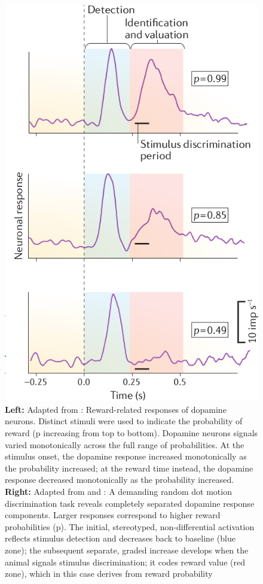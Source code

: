 \begin{figure}[H]
    \includegraphics[scale=0.3]{figures/ResponseProbSchultz.png}
    \caption{\textbf{Left:} Adapted from : Reward-related responses of dopamine neurons. Distinct stimuli were used to indicate the probability of reward (p increasing from top to bottom). Dopamine neurons signals varied monotonically across the full range of probabilities. At the stimulus onset, the dopamine response increased monotonically as the probability increased; at the reward time instead, the dopamine response decreased monotonically as the probability increased. \textbf{Right:} Adapted from  and : A demanding random dot motion discrimination task reveals completely separated dopamine response components. Larger responses correspond to higher reward probabilities (p). The initial, stereotyped, non-differential activation reflects stimulus detection and decreases back to baseline (blue zone); the subsequent separate, graded increase develops when the animal signals stimulus discrimination; it codes reward value (red zone), which in this case derives from reward probability}
    \label{fig:probDopamine}
\end{figure}
